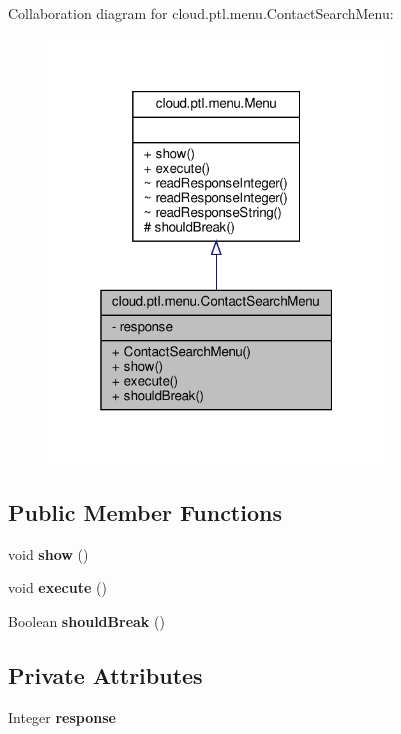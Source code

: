 Collaboration diagram for cloud.\+ptl.\+menu.\+Contact\+Search\+Menu\+:
\nopagebreak
\begin{figure}[H]
\begin{center}
\leavevmode
\includegraphics[width=253pt]{classcloud_1_1ptl_1_1menu_1_1ContactSearchMenu__coll__graph}
\end{center}
\end{figure}
\subsection*{Public Member Functions}
\begin{DoxyCompactItemize}
\item 
\mbox{\label{classcloud_1_1ptl_1_1menu_1_1ContactSearchMenu_af6a25137b3e2d6a3a3ca8a3d19c71ff5}} 
void {\bfseries show} ()
\item 
\mbox{\label{classcloud_1_1ptl_1_1menu_1_1ContactSearchMenu_a035faae43eea3c05192b9594feaac6a4}} 
void {\bfseries execute} ()
\item 
\mbox{\label{classcloud_1_1ptl_1_1menu_1_1ContactSearchMenu_a4df75d932df8d5a92b0dee64a15dce33}} 
Boolean {\bfseries should\+Break} ()
\end{DoxyCompactItemize}
\subsection*{Private Attributes}
\begin{DoxyCompactItemize}
\item 
\mbox{\label{classcloud_1_1ptl_1_1menu_1_1ContactSearchMenu_a45a1b2fe08c5117d45dcf51c20e12623}} 
Integer {\bfseries response}
\end{DoxyCompactItemize}
